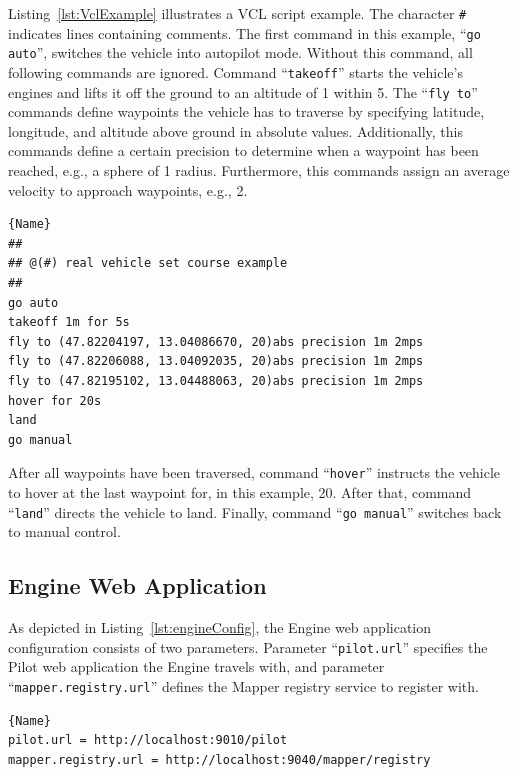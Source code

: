 Listing~\ref{lst:VclExample} illustrates a \ac{VCL} script example. 
The character \texttt{\#} indicates lines containing comments.
%
The first command in this example, ``\texttt{go auto}'', switches the vehicle into autopilot mode. Without
this command, all following commands are ignored. Command ``\texttt{takeoff}'' starts the vehicle's engines
and lifts it off the ground to an altitude of \unit{1}{\meter} within \unit{5}{\second}.
%
The ``\texttt{fly to}'' commands define waypoints the vehicle has to traverse by specifying latitude, longitude,
and altitude above ground in absolute values. Additionally, this commands define a certain precision to
determine when a waypoint has been reached, e.g., a sphere of \unit{1}{\meter} radius. Furthermore, this commands
assign an average velocity to approach waypoints, e.g., \unit{2}{\meter\per\second}.
% 
\lstset{tabsize=3,language=Tex}
\begin{lstlisting}[caption={Vehicle Control Language Example},mathescape=true,label=lst:VclExample]{Name}
##
## @(#) real vehicle set course example
##
go auto
takeoff 1m for 5s
fly to (47.82204197, 13.04086670, 20)abs precision 1m 2mps
fly to (47.82206088, 13.04092035, 20)abs precision 1m 2mps
fly to (47.82195102, 13.04488063, 20)abs precision 1m 2mps
hover for 20s
land
go manual
\end{lstlisting}
%
After all waypoints have been traversed, command ``\texttt{hover}'' instructs the vehicle to hover at
the last waypoint for, in this example, \unit{20}{\second}. After that, command ``\texttt{land}'' directs
the vehicle to land. Finally, command ``\texttt{go manual}'' switches back to manual control.


\subsection{Engine Web Application}

As depicted in Listing~\ref{lst:engineConfig}, the Engine web application configuration consists
of two parameters. Parameter ``\texttt{pilot.url}'' specifies the Pilot web application the Engine
travels with, and parameter ``\texttt{mapper.registry.url}'' defines the Mapper registry service to
register with.
\lstset{tabsize=3,language=Tex}
\begin{lstlisting}[caption={Engine Configuration Example},mathescape=true,label=lst:engineConfig]{Name}
pilot.url = http://localhost:9010/pilot
mapper.registry.url = http://localhost:9040/mapper/registry
\end{lstlisting}



